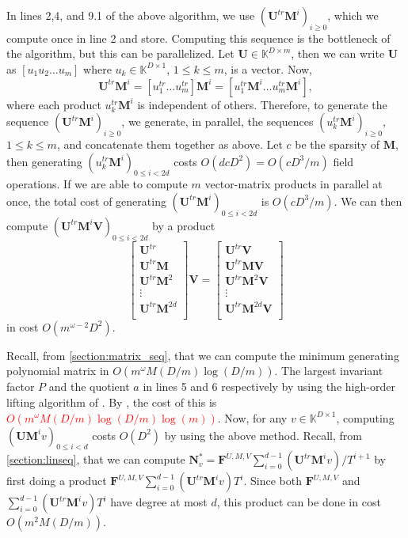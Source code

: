 \documentclass[12pt]{article}
\newcommand{\todo}[1]{\textcolor{red}{#1}}
\def\mF{\mathbf{F}}
\def\mM{\mathbf{M}}
\def\mN{\mathbf{N}}
\def\mU{\mathbf{U}}
\def\mV{\mathbf{V}}
\begin{document}
In lines 2,4, and 9.1 of the above algorithm, we use $(\mU^{tr}\mM^i)_{i\ge 0}$, which we compute once
in line 2 and store. Computing this sequence is the bottleneck of the algorithm, but this can be
parallelized. Let $\mU \in \mathbb{K}^{D \times m}$, then we can write $\mU$ as $[u_1 u_2 \dots u_m]$ where
$u_k \in \mathbb{K}^{D \times 1}$, $1 \le k \le m$, is a vector. Now,
$$ \mU^{tr} \mM^i = [u_1^{tr} \dots u_m^{tr}] \mM^i = [u_1^{tr} \mM^i \dots u_m^{tr} \mM^i],$$
where each product $u_k^{tr} \mM^i$ is independent of others. Therefore, to generate the
sequence $(\mU^{tr}\mM^i)_{i\ge0}$, we generate, in parallel, 
the sequences $(u_k^{tr} \mM^i)_{i\ge0}$, $1 \le k \le m$, and concatenate them together as above.
Let $c$ be the sparsity of $\mM$, then generating $(u_k^{tr} \mM^i)_{0 \le i < 2d}$ costs 
$O(d cD^2) = O(cD^3/m )$ field operations. If we are able to compute $m$ 
vector-matrix products in parallel at once, the total cost of generating $(\mU^{tr}\mM^i)_{0 \le i < 2d}$
is $O(cD^3/m)$. We can then compute $(\mU^{tr}\mM^i\mV)_{0 \le i < 2d}$ by a product
$$
\begin{bmatrix}
\mU^{tr}\\
\mU^{tr} \mM\\
\mU^{tr} \mM^2\\
\vdots\\
\mU^{tr} \mM^{2d}\\
\end{bmatrix} \mV
= 
\begin{bmatrix}
\mU^{tr} \mV\\
\mU^{tr} \mM \mV\\
\mU^{tr} \mM^2 \mV\\
\vdots \\
\mU^{tr} \mM^{2d} \mV\\
\end{bmatrix}
$$
in cost $O(m^{\omega-2}D^2)$.

Recall, from \cref{section:matrix_seq}, that we can compute
the minimum generating polynomial matrix in $O(m^{\omega} M(D/m) \log(D/m))$.
The largest invariant factor $P$ and the quotient $a$ in lines 5 and 6 respectively by using the high-order
lifting algorithm of \cite[Algorithm~5]{Stor03}. 
By \cite[Corollary~16]{Stor03}, the cost of this is 
\todo{$O(m^{\omega} M(D/m) \log(D/m) \log(m))$}.
Now, for any $v\in\mathbb{K}^{D \times 1}$, computing $(\mU \mM^i v)_{0\le i < d}$ costs
$O(D^2)$ by using the above method.
Recall, from \cref{section:linseq}, that
we can compute $\mN_v^* = \mF^{U,M,V}\sum_{i=0}^{d-1} {(\mU^{tr}\mM^iv)}/{T^{i+1}}$ by first
doing a product $\mF^{U,M,V}\sum_{i=0}^{d-1} {(\mU^{tr}\mM^iv)}T^i$.
Since both $\mF^{U,M,V}$ and $\sum_{i=0}^{d-1} {(\mU^{tr}\mM^iv)}T^i$
have degree at most $d$, this product can be done in cost $O(m^2M(D/m))$.
\end{document}
